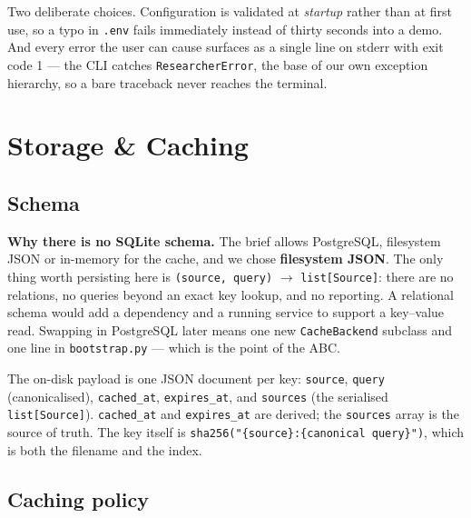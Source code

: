 \documentclass[11pt,a4paper]{article}
\begin{document}
\vspace{0.4em}
Two deliberate choices. Configuration is validated at \emph{startup} rather than at first use, so a
typo in \texttt{.env} fails immediately instead of thirty seconds into a demo. And every error the
user can cause surfaces as a single line on stderr with exit code 1 --- the CLI catches
\texttt{ResearcherError}, the base of our own exception hierarchy, so a bare traceback never reaches
the terminal.

\section{Storage \& Caching}\label{sec:storage}

\subsection{Schema}

\begin{deliverbox}
\textbf{Why there is no SQLite schema.} The brief allows PostgreSQL, filesystem JSON or in-memory
for the cache, and we chose \textbf{filesystem JSON}. The only thing worth persisting here is
\texttt{(source, query)} $\rightarrow$ \texttt{list[Source]}: there are no relations, no queries
beyond an exact key lookup, and no reporting. A relational schema would add a dependency and a
running service to support a key--value read. Swapping in PostgreSQL later means one new
\texttt{CacheBackend} subclass and one line in \texttt{bootstrap.py} --- which is the point of the
ABC.
\end{deliverbox}

\vspace{0.4em}
The on-disk payload is one JSON document per key:
\texttt{source}, \texttt{query} (canonicalised), \texttt{cached\_at}, \texttt{expires\_at}, and
\texttt{sources} (the serialised \texttt{list[Source]}). \texttt{cached\_at} and \texttt{expires\_at}
are derived; the \texttt{sources} array is the source of truth. The key itself is
\texttt{sha256("\{source\}:\{canonical query\}")}, which is both the filename and the index.

\subsection{Caching policy}
\end{document}
